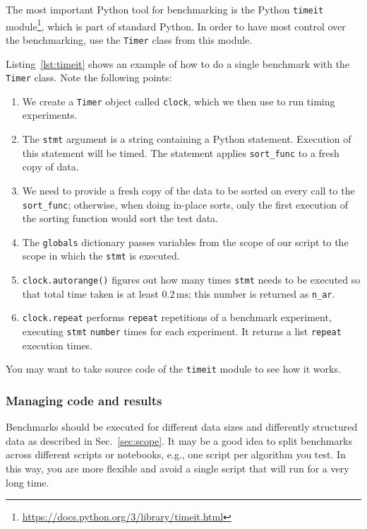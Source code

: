 \documentclass[sigconf, nonacm, natbib, screen, balance=False]{acmart}
\begin{document}
The most important Python tool for benchmarking is the Python
\verb!timeit!
module\footnote{\url{https://docs.python.org/3/library/timeit.html}},
which is part of standard Python. In order to have most control over
the benchmarking, use the \verb!Timer! class from this module.

Listing~\ref{lst:timeit} shows an example of how to do a single
benchmark with the \verb!Timer! class. Note the following points:
\begin{enumerate}
  \item We create a \verb!Timer! object called \verb!clock!, which we
    then use to run timing experiments.
  \item The \verb!stmt! argument is a string containing a Python
    statement. Execution of this statement will be timed. The
    statement applies \verb!sort_func! to a fresh copy of data.
  \item We need to provide a fresh copy of the data to be sorted on
    every call to the \verb!sort_func!; otherwise, when doing in-place
    sorts, only the first execution of the sorting function would sort
    the test data.
  \item The \verb!globals! dictionary passes variables from the scope
    of our script to the scope in which the \verb!stmt! is executed.
  \item \verb!clock.autorange()! figures out how many times
    \verb!stmt! needs to be executed so that total time taken is at
    least $0.2\,\text{ms}$; this number is returned as \verb!n_ar!.
  \item \verb!clock.repeat! performs \verb!repeat! repetitions of a
    benchmark experiment, executing \verb!stmt! \verb!number! times
    for each experiment. It returns a list \verb!repeat! execution
    times.
\end{enumerate}
You may want to take source code of the \verb!timeit! module to see
how it works.

\subsubsection{Managing code and results}

Benchmarks should be executed for different data sizes and differently
structured data as described in Sec.~\ref{sec:scope}. It may be a good
idea to split benchmarks across different scripts or notebooks, e.g., one script
per algorithm you test. In this way, you are more flexible and avoid a
single script that will run for a very long time.
\end{document}
